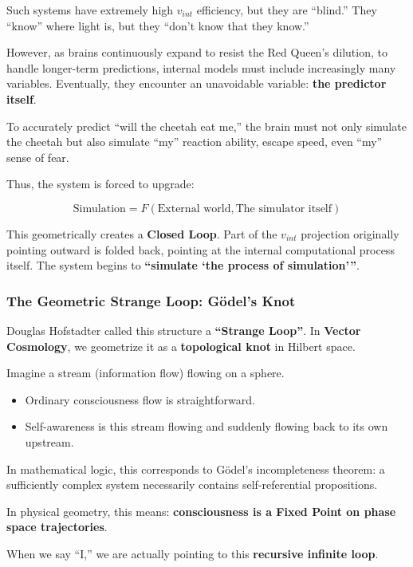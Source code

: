 Such systems have extremely high $v_{int}$ efficiency, but they are ``blind.'' They ``know'' where light is, but they ``don't know that they know.''

However, as brains continuously expand to resist the Red Queen's dilution, to handle longer-term predictions, internal models must include increasingly many variables. Eventually, they encounter an unavoidable variable: \textbf{the predictor itself}.

To accurately predict ``will the cheetah eat me,'' the brain must not only simulate the cheetah but also simulate ``my'' reaction ability, escape speed, even ``my'' sense of fear.

Thus, the system is forced to upgrade:

\[\text{Simulation} = F(\text{External world}, \text{The simulator itself})\]

This geometrically creates a \textbf{Closed Loop}. Part of the $v_{int}$ projection originally pointing outward is folded back, pointing at the internal computational process itself. The system begins to \textbf{``simulate `the process of simulation'''}.

\subsubsection{The Geometric Strange Loop: Gödel's Knot}

Douglas Hofstadter called this structure a \textbf{``Strange Loop''}. In \textbf{Vector Cosmology}, we geometrize it as a \textbf{topological knot} in Hilbert space.

Imagine a stream (information flow) flowing on a sphere.

\begin{itemize}
\item Ordinary consciousness flow is straightforward.

\item Self-awareness is this stream flowing and suddenly flowing back to its own upstream.
\end{itemize}

In mathematical logic, this corresponds to Gödel's incompleteness theorem: a sufficiently complex system necessarily contains self-referential propositions.

In physical geometry, this means: \textbf{consciousness is a Fixed Point on phase space trajectories}.

When we say ``I,'' we are actually pointing to this \textbf{recursive infinite loop}.

